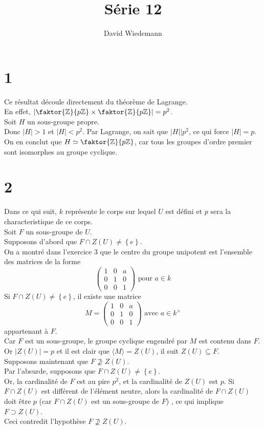 \documentclass[11pt, a4paper]{article}
\newcommand{\zpz}{\faktor{\mathbb{Z}}{p \mathbb{Z}}}
\begin{document}
\title{Série 12}
\author{David Wiedemann}
\maketitle
\section*{1}
Ce résultat découle directement du théorème de Lagrange.\\
En effet, $| \faktor { \mathbb{Z}} { p \mathbb{Z}} \times \zpz | = p^{2}$.\\
Soit $H$ un sous-groupe propre.\\
Donc $|H|>1$ et $|H|< p^{2}$.
Par Lagrange, on sait que $|H| \big\vert p^{2}$, ce qui force $|H|=p$.\\
On en conclut que $H \simeq \zpz$, car tous les groupes d'ordre premier sont isomorphes au groupe cyclique.\\
\section*{2}
Dans ce qui suit, $k$ représente le corps sur lequel $U$ est défini et $p$ sera la characteristique de ce corps.\\
Soit $F$ un sous-groupe de $U$.\\
Supposons d'abord que $F \cap Z( U) \neq \left\{ e  \right\} $.\\
On a montré dans l'exercice 3 que le centre du groupe unipotent est l'ensemble des matrices de la forme
\[ 
\begin{pmatrix}
	1 & 0 & a\\
	0 & 1 & 0\\
	0 & 0 & 1
\end{pmatrix}
\text{ pour } a \in k
\]
Si $F \cap Z( U) \neq \left\{ e  \right\} $, il existe une matrice 
\[ 
	M=
\begin{pmatrix}
	1 & 0 & a\\
	0 & 1 & 0\\
	0 & 0 & 1
\end{pmatrix}
\text{ avec } a \in k^{\times}	
\]
appartenant à $F$.\\
Car  $F$ est un sous-groupe, le groupe cyclique engendré par $M$ est contenu dans $F$.\\
Or $|Z( U) | = p$ et il est clair que $\langle M \rangle = Z( U) $, il suit $Z( U) \subseteq F$.\\
Supposons maintenant que $F \not \supseteq Z( U) $.\\
Par l'absurde, supposons que $F \cap Z( U) \neq \left\{ e  \right\} $.\\
Or, la cardinalité de $F$ est au pire $p^{2}$, et la cardinalité de $Z( U)$ est $p$. Si  $F \cap Z( U) $  est différent de l'élément neutre, alors la cardinalité de $F\cap Z( U) $ doit être $p$ (car $F\cap Z( U) $ est un sous-groupe de $F$) , ce qui implique $F \supset Z( U) $.\\
Ceci contredit l'hypothèse $F\not\supseteq Z( U) $.
\end{document}
